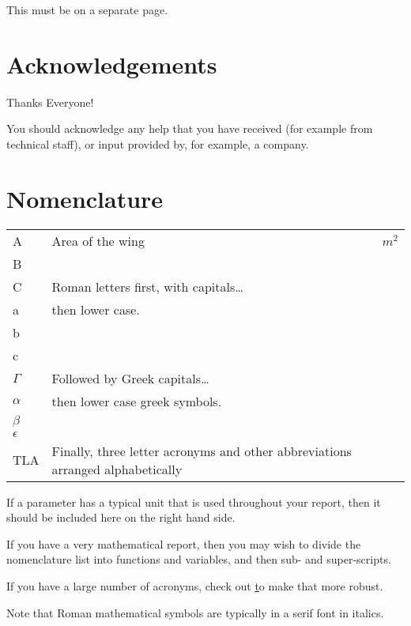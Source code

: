 \documentclass[a4paper,oneside,12pt]{book}
\numberwithin{equation}{chapter} %
\begin{document}
This must be on a separate page.

\newpage
\onehalfspacing\raggedright %

\section*{\Huge\textcolor{tcd_blue}{Acknowledgements}}
Thanks Everyone!

You should acknowledge any help that you have received (for example from technical staff), or input provided by, for example, a company.
\tableofcontents
\listoffigures
\listoftables
\newpage
\section*{\Huge\textcolor{tcd_blue}{Nomenclature}}
\begin{tabular}{lp{9cm}l}
A&Area of the wing&$m^{2}$\\
B\\
C& Roman letters first, with capitals\ldots\\
a&then lower case.\\
b\\
c\\
$\Gamma$&Followed by Greek capitals\ldots\\
$\alpha$&then lower case greek symbols.\\
$\beta$\\
$\epsilon$\\
TLA&Finally, three letter acronyms and other abbreviations arranged alphabetically\\
\end{tabular}
\vspace{2cm}

If a parameter has a typical unit that is used throughout your report, then it should be included here on the right hand side.

If you have a very mathematical report, then you may wish to divide the nomenclature list into functions and variables, and then sub- and super-scripts.

If you have a large number of acronyms, check out \href{https://www.overleaf.com/learn/latex/Glossaries} to make that more robust.

Note that Roman mathematical symbols are typically in a serif font in italics.

\mainmatter







%
\nocite{*}


\appendix
\renewcommand{\thechapter}{A\arabic{chapter}}

\end{document}

